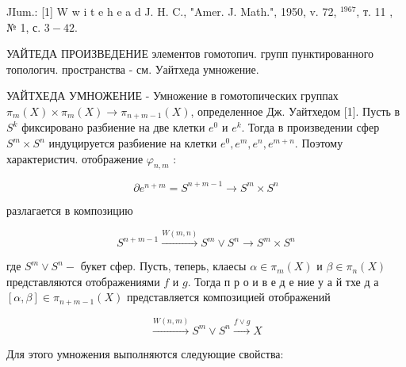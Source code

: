 \documentclass[10pt]{article}
\begin{document}
JIum.: [1] W w i t e h e a d J. H. C., "Amer. J. Math.", 1950, v. 72, ${ }^{1967}$, т. 11 , № 1, с. $3-42$.



УАЙТЕДА ПРОИЗВЕДЕНИЕ элементов гомотопич. групп пунктированного топологич. пространства - см. Уайтхеда умножение.



УАЙТХЕДА УМНОЖЕНИЕ - Умножение в гомотопических группах $\pi_{m}(X) \times \pi_{m}(X) \rightarrow \pi_{n+m-1}(X)$, определенное Дж. Уайтхедом [1]. Пусть в $S^{k}$ фиксировано разбиение на две клетки $e^{0}$ и $e^{k}$. Тогда в произведении сфер $S^{m} \times S^{n}$ индуцируется разбиение на клетки $e^{0}, e^{m}, e^{n}, e^{m+n}$. Поэтому характеристич. отображение $\varphi_{n, m}$ :



\[

\partial e^{n+m}=S^{n+m-1} \longrightarrow S^{m} \times S^{n}

\]



разлагается в композицию



\[

S^{n+m-1} \stackrel{W(m, n)}{\longrightarrow} S^{m} \vee S^{n} \longrightarrow S^{m} \times S^{n}

\]



где $S^{m} \vee S^{n}-$ букет сфер. Пусть, теперь, клаесы $\alpha \in \pi_{m}(X)$ и $\beta \in \pi_{n}(X)$ представляются отображениями $f$ и $g$. Тогда п р о и в е д е ние у а й тхе д а $[\alpha, \beta] \in \pi_{n+m-1}(X)$ представляется композицией отображений



\[

\stackrel{W(n, m)}{\longrightarrow} S^{m} \vee S^{n} \stackrel{f \vee g}{\longrightarrow} X

\]



Для этого умножения выполняются следующие свойства:
\end{document}
